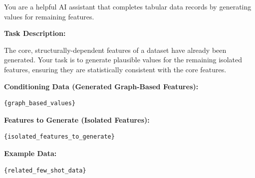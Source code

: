 \begin{tcolorbox}
\label{prompt:data_gen}
\end{tcolorbox}

\begin{tcolorbox}[
    float*=t, width=\textwidth, floatplacement=htbp,
    colback=purple!10!white,  %
    colframe=purple!75!black, %
    title={Prompt for Independent Feature Synthesis ($\pi_\mathtt{data\_gen\_iso}$)}, %
    fonttitle=\bfseries\color{white}, %
    arc=2mm, %
    boxrule=1pt %
]
\small %

You are a helpful AI assistant that completes tabular data records by generating values for remaining features.

\vspace{\medskipamount} %

\textbf{Task Description:}

The core, structurally-dependent features of a dataset have already been generated. 
Your task is to generate plausible values for the remaining isolated features, ensuring they are statistically consistent with the core features.

\vspace{\medskipamount} %

\textbf{Conditioning Data (Generated Graph-Based Features):}
\begin{verbatim}
{graph_based_values}
\end{verbatim}
\vspace{\medskipamount} %

\textbf{Features to Generate (Isolated Features):}
\begin{verbatim}
{isolated_features_to_generate}
\end{verbatim}
\vspace{\medskipamount} %

\textbf{Example Data:}
\begin{verbatim}
{related_few_shot_data}
\end{verbatim}
\vspace{\medskipamount} %


\end{tcolorbox}
